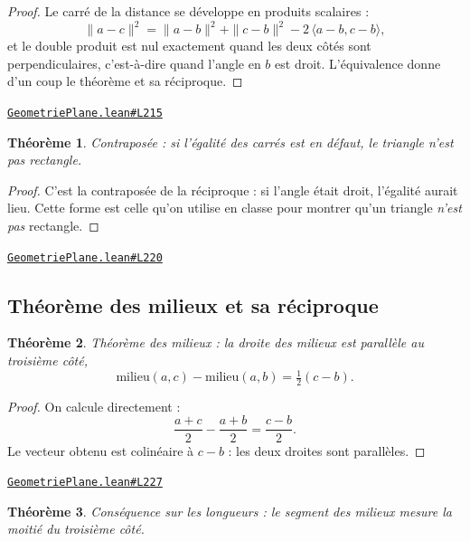 \documentclass[11pt,a4paper]{article}
\theoremstyle{definition}
\theoremstyle{plain}
\newtheorem{theoreme}{Théorème}
\newcommand{\source}[2]{\par\smallskip\noindent\hfill{\footnotesize\href{#1}{\texttt{#2}}}\par\smallskip}
\begin{document}
\begin{proof}
Le carré de la distance se développe en produits scalaires :
\[ \|a - c\|^2 = \|a - b\|^2 + \|c - b\|^2 - 2\,\langle a - b, c - b\rangle , \]
et le double produit est nul exactement quand les deux côtés sont perpendiculaires,
c'est-à-dire quand l'angle en $b$ est droit. L'équivalence donne d'un coup le théorème et
sa réciproque.
\end{proof}
\source{https://github.com/Commutator-IO/learn-lean/blob/main/cours/01-college/02-geometrie-plane/GeometriePlane.lean\#L215}{GeometriePlane.lean\#L215}

\begin{theoreme}
Contraposée : si l'égalité des carrés est en défaut, le triangle n'est pas rectangle.
\end{theoreme}

\begin{proof}
C'est la contraposée de la réciproque : si l'angle était droit, l'égalité aurait lieu.
Cette forme est celle qu'on utilise en classe pour montrer qu'un triangle \emph{n'est
pas} rectangle.
\end{proof}
\source{https://github.com/Commutator-IO/learn-lean/blob/main/cours/01-college/02-geometrie-plane/GeometriePlane.lean\#L220}{GeometriePlane.lean\#L220}

\subsection{Théorème des milieux et sa réciproque}

\begin{theoreme}
Théorème des milieux : la droite des milieux est parallèle au troisième côté,
\[ \text{milieu}(a,c) - \text{milieu}(a,b) = \tfrac{1}{2}(c - b) . \]
\end{theoreme}

\begin{proof}
On calcule directement :
\[ \frac{a+c}{2} - \frac{a+b}{2} = \frac{c - b}{2} . \]
Le vecteur obtenu est colinéaire à $c - b$ : les deux droites sont parallèles.
\end{proof}
\source{https://github.com/Commutator-IO/learn-lean/blob/main/cours/01-college/02-geometrie-plane/GeometriePlane.lean\#L227}{GeometriePlane.lean\#L227}

\begin{theoreme}
Conséquence sur les longueurs : le segment des milieux mesure la moitié du troisième
côté.
\end{theoreme}
\end{document}

